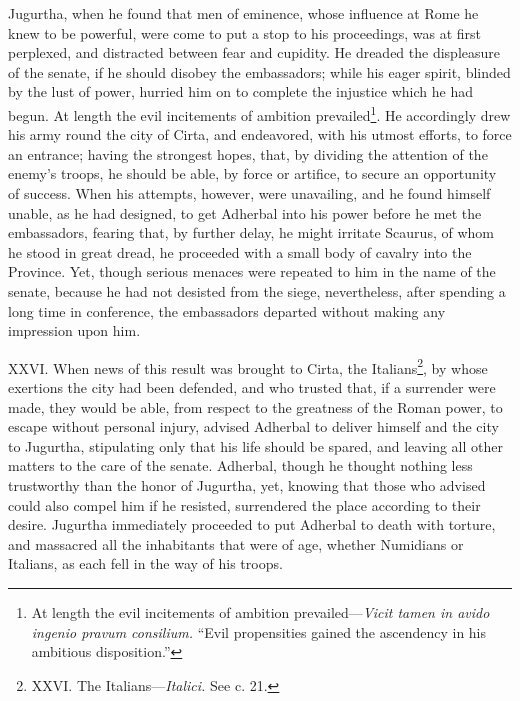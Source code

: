 Jugurtha, when he found that men of eminence, whose influence at Rome
he knew to be powerful, were come to put a stop to his proceedings,
was at first perplexed, and distracted between fear and cupidity. He
dreaded the displeasure of the senate, if he should disobey the
embassadors; while his eager spirit, blinded by the lust of power,
hurried him on to complete the injustice which he had begun. At length
the evil incitements of ambition prevailed\footnote{At length the evil incitements of ambition prevailed—\emph{Vicit
tamen in avido ingenio pravum consilium.} ``Evil propensities gained
the ascendency in his ambitious disposition.''}. He accordingly drew
his army round the city of Cirta, and endeavored, with his utmost
efforts, to force an entrance; having the strongest hopes, that, by
dividing the attention of the enemy's troops, he should be able, by
force or artifice, to secure an opportunity of success. When his
attempts, however, were unavailing, and he found himself unable, as
he had designed, to get Adherbal into his power before he met the
embassadors, fearing that, by further delay, he might irritate
Scaurus, of whom he stood in great dread, he proceeded with a small
body of cavalry into the Province. Yet, though serious menaces were
repeated to him in the name of the senate, because he had not desisted
from the siege, nevertheless, after spending a long time in conference,
the embassadors departed without making any impression upon him.

XXVI. When news of this result was brought to Cirta, the Italians\footnote{XXVI. The Italians—\emph{Italici.} See c. 21.},
by whose exertions the city had been defended, and who trusted that, if
a surrender were made, they would be able, from respect to the greatness
of the Roman power, to escape without personal injury, advised Adherbal
to deliver himself and the city to Jugurtha, stipulating only that his
life should be spared, and leaving all other matters to the care of the
senate. Adherbal, though he thought nothing less trustworthy than the
honor of Jugurtha, yet, knowing that those who advised could also compel
him if he resisted, surrendered the place according to their desire.
Jugurtha immediately proceeded to put Adherbal to death with torture,
and massacred all the inhabitants that were of age, whether Numidians
or Italians, as each fell in the way of his troops.


